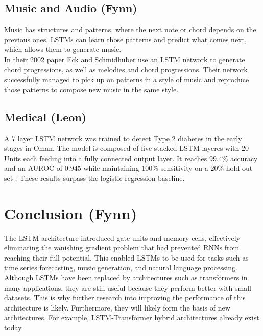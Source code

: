 \documentclass[twoside,a4paper,10pt,DIV=12,BCOR=12mm]{scrartcl}
\begin{document}
\subsection{Music and Audio (Fynn)}
Music has structures and patterns, where the next note or chord depends on the previous ones. LSTMs can learn those patterns and predict what comes next, which allows them to generate music.\cite{eck2002musicgeneration}\\
In their 2002 paper Eck and Schmidhuber use an LSTM network to generate chord progressions, as well as melodies and chord progressions. Their network successfully managed to pick up on patterns in a style of music and reproduce those patterns to compose new music in the same style.\cite{eck2002musicgeneration}  

\subsection{Medical (Leon)}

A 7 layer LSTM network was trained to detect Type 2 diabetes in the early stages in Oman. The model is composed of five stacked
LSTM layeres with 20 Units each feeding into a fully connected output layer. It reaches \begin{math}99.4 \%\end{math} accuracy and an 
AUROC of \begin{math}0.945\end{math} while maintaining \begin{math}100 \%\end{math} sensitivity on a \begin{math}20 \%\end{math} hold-out set \cite{AlSadi2024LSTM}.
These results surpass the logistic regression baseline.


\section{Conclusion (Fynn)}
The LSTM architecture introduced gate units and memory cells, effectively eliminating the vanishing gradient problem that had prevented RNNs from reaching their full potential.\cite{hochreiter1997lstm} 
This enabled LSTMs to be used for tasks such as time series forecasting, music generation, and natural language processing.\cite{eck2002musicgeneration,nielsen2024electricitypriceforcasting,gers2001timeseries,torres2022elctricityforecasting,sak2014longshorttermmemorybased}\\
Although LSTMs have been replaced by architectures such as transformers in many applications, they are still useful because they perform better with small datasets. This is why further research into improving the performance of this architecture is likely.\cite{alselwi2024lstmfuture} Furthermore, they will likely form the basis of new architectures. For example, LSTM-Transformer hybrid architectures already exist today. \cite{zhao2025lstmtransformerhybrid} 
\end{document}
